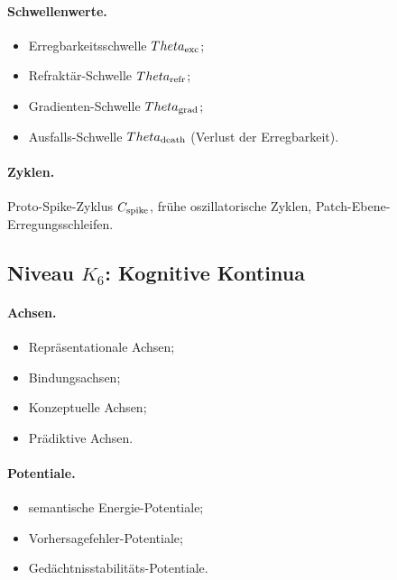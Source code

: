 \paragraph{Schwellenwerte.}
\begin{itemize}
    \item Erregbarkeitsschwelle \(\Theta_{\rm exc}\);
    \item Refraktär-Schwelle \(\Theta_{\rm refr}\);
    \item Gradienten-Schwelle \(\Theta_{\rm grad}\);
    \item Ausfalls-Schwelle \(\Theta_{\rm death}\) (Verlust der Erregbarkeit).
\end{itemize}

\paragraph{Zyklen.}
Proto-Spike-Zyklus \(C_{\rm spike}\),
frühe oszillatorische Zyklen,
Patch-Ebene-Erregungsschleifen.

\subsection{Niveau \texorpdfstring{\texorpdfstring{$K_6$}{K\_6}}{K6}: Kognitive Kontinua}

\paragraph{Achsen.}
\begin{itemize}
    \item Repräsentationale Achsen;
    \item Bindungsachsen;
    \item Konzeptuelle Achsen;
    \item Prädiktive Achsen.
\end{itemize}

\paragraph{Potentiale.}
\begin{itemize}
    \item semantische Energie-Potentiale;
    \item Vorhersagefehler-Potentiale;
    \item Gedächtnisstabilitäts-Potentiale.
\end{itemize}

